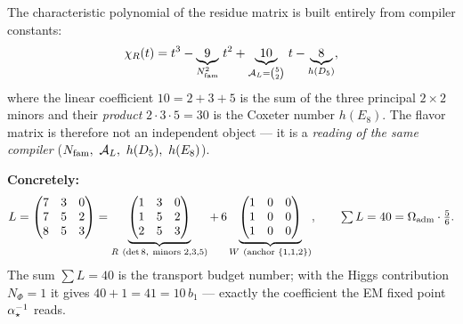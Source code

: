\begin{center}
\end{center}

\begin{winbox}
The characteristic polynomial of the residue matrix is built entirely from compiler constants:
\[
  \chi_R(t)=t^3-\underbrace{9}_{N_{\mathrm{fam}}^2}\,t^2+\underbrace{10}_{\mathcal A_L=\binom52}\,t-\underbrace{8}_{h(D_5)} ,
\]
where the linear coefficient $10=2+3+5$ is the sum of the three principal $2{\times}2$ minors and their
\emph{product} $2\cdot3\cdot5=30$ is the Coxeter number $h(E_8)$. The flavor matrix is therefore not an
independent object --- it is a \emph{reading of the same compiler} ($N_{\mathrm{fam}},\ \mathcal A_L,\ h(D_5),\
h(E_8)$). \mE\ 
\end{winbox}

\noindent\textbf{Concretely:}
\[
  L=\begin{pmatrix}7&3&0\\7&5&2\\8&5&3\end{pmatrix}
  =\underbrace{\begin{pmatrix}1&3&0\\1&5&2\\2&5&3\end{pmatrix}}_{R\ (\det 8,\ \text{minors }2{,}3{,}5)}
  +\,6\underbrace{\begin{pmatrix}1&0&0\\1&0&0\\1&0&0\end{pmatrix}}_{W\ (\text{anchor }\{1,1,2\})},\qquad
  \textstyle\sum L=40=\Oadm\cdot\tfrac56 .
\]
The sum $\sum L=40$ is the transport budget number; with the Higgs contribution $N_\Phi=1$ it gives
$40+1=41=10\,b_1$ --- exactly the coefficient the EM fixed point $\alpha^{-1}_\star$ reads.

